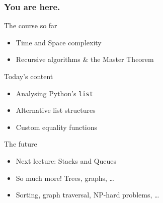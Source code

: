 \begin{frame}
	\frametitle{You are here.}
	\begin{block}{The course so far}
		\begin{itemize}
			\item Time and Space complexity
			\item Recursive algorithms \& the Master Theorem
		\end{itemize}
	\end{block}
	\pause
	\begin{exampleblock}{Today's content}
		\begin{itemize}
			\item Analysing Python's \texttt{list}
			\item Alternative list structures
			\item Custom equality functions
		\end{itemize}
	\end{exampleblock}
	\pause
	\begin{block}{The future}
		\begin{itemize}
			\item Next lecture: Stacks and Queues
			\item So much more! Trees, graphs, \dots
			\item Sorting, graph traversal, NP-hard problems, \dots
		\end{itemize}
	\end{block}
\end{frame}

